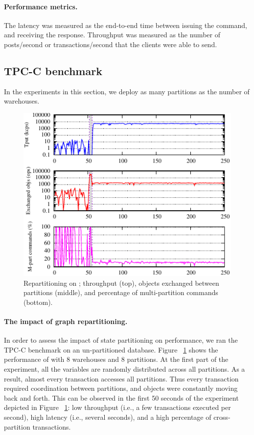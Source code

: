 \paragraph*{Performance metrics.}
%
The latency was measured as the end-to-end time between issuing the
command, and receiving the response.  Throughput was measured as the
number of posts/second or transactions/second that the clients were able to send.

\subsection{TPC-C benchmark}
\label{sec:evaluation:tpc-c}

In the experiments in this section, we deploy as many partitions as the number of warehouses.

\begin{figure}[ht!]
  \centering
    \includegraphics[width=0.8\columnwidth]{figures/experiments/tpcc-detail-dynastar}
  \caption{Repartitioning on \dynastar; throughput (top), objects exchanged between partitions (middle), 
  and percentage of multi-partition commands (bottom).}
  \label{fig:tpcc_repartitioning}
\end{figure}

\paragraph{The impact of graph repartitioning.}
In order to assess the impact of state partitioning on performance, we ran the TPC-C benchmark on an 
un-partitioned database.  Figure ~\ref{fig:tpcc_repartitioning} 
shows the performance of \dynastar with 8 warehouses and 8 partitions.
At the first part of the experiment, all the variables are randomly distributed across all partitions.
As a result, almost every transaction accesses all partitions. Thus every transaction 
required coordination between partitions, and objects were constantly moving back and forth. 
This can be observed in the first 50 seconds of the experiment depicted in Figure 
~\ref{fig:tpcc_repartitioning}: low throughput (i.e., a few transactions executed per second), 
high latency (i.e., several seconds), and a high percentage of cross-partition transactions.

